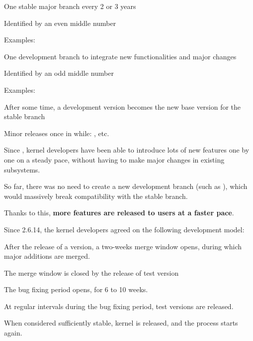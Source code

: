 
  \startitemize
  \item One stable major branch every 2 or 3 years
    \startitemize
    \item Identified by an even middle number
    \item Examples: 
    \stopitemize
  \item One development branch to integrate new functionalities and
    major changes
    \startitemize
    \item Identified by an odd middle number
    \item Examples: 
    \item After some time, a development version becomes the new base
      version for the stable branch
    \stopitemize
  \item Minor releases once in while: , etc.
  \stopitemize


  \startitemize
  \item Since , kernel developers have been able to
    introduce lots of new features one by one on a steady pace,
    without having to make major changes in existing subsystems.
  \item So far, there was no need to create a new development branch
    (such as ), which would massively break compatibility
    with the stable branch.
  \item Thanks to this, {\bf more features are released to users at a
      faster pace}.
  \stopitemize

  Since 2.6.14, the kernel developers agreed on the following
  development model:
  \startitemize
  \item After the release of a  version, a two-weeks merge
    window opens, during which major additions are merged.
  \item The merge window is closed by the release of test version
  \item The bug fixing period opens, for 6 to 10 weeks.
  \item At regular intervals during the bug fixing period,
     test versions are released.
  \item When considered sufficiently stable, kernel 
    is released, and the process starts again.
  \stopitemize

